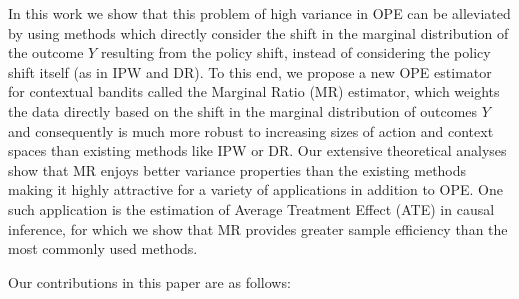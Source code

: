 In this work we show that this problem of high variance in OPE can be alleviated by using methods which directly consider the shift in the marginal distribution of the outcome $Y$ resulting from the policy shift, instead of considering the policy shift itself (as in IPW and DR). To this end, we propose a new OPE estimator for contextual bandits called the Marginal Ratio (MR) estimator, which weights the data directly based on the shift in the marginal distribution of outcomes $Y$ and consequently is much more robust to increasing sizes of action and context spaces than existing methods like IPW or DR. 
Our extensive theoretical analyses show that MR enjoys better variance properties than the existing methods making it highly attractive for a variety of applications in addition to OPE. One such application is the estimation of Average Treatment Effect (ATE) in causal inference, for which we show that MR provides greater sample efficiency than the most commonly used methods.

Our contributions in this paper are as follows:



